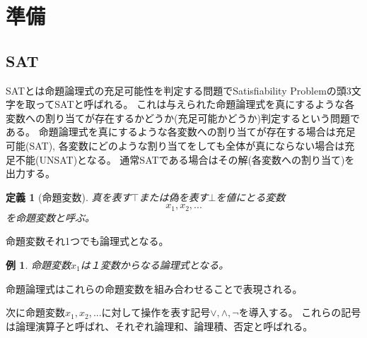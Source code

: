 \documentclass[titlepage]{jsarticle}
\newtheorem{definition}[thm]{定義}
\newtheorem{example}[thm]{例}
\begin{document}
\section{準備}





\subsection{SAT}



SATとは命題論理式の充足可能性を判定する問題でSatisfiability Problemの頭3文字を取ってSATと呼ばれる。
これは与えられた命題論理式を真にするような各変数への割り当てが存在するかどうか(充足可能かどうか)判定するという問題である。
命題論理式を真にするような各変数への割り当てが存在する場合は充足可能(SAT), 各変数にどのような割り当てをしても全体が真にならない場合は充足不能(UNSAT)となる。
通常SATである場合はその解(各変数への割り当て)を出力する。

\begin{definition}[命題変数]
	真を表す$\top$または偽を表す$\bot$を値にとる変数
	\[
	x_1, x_2, ...
	\]
	を命題変数と呼ぶ。
\end{definition}
命題変数それ1つでも論理式となる。
\begin{example}
	命題変数$x_1$は１変数からなる論理式となる。
\end{example}
命題論理式はこれらの命題変数を組み合わせることで表現される。

次に命題変数$x_1, x_2, ...$に対して操作を表す記号$\lor, \land, \neg$を導入する。
これらの記号は論理演算子と呼ばれ、それぞれ論理和、論理積、否定と呼ばれる。
\begin{comment}
命題変数$x_i$と$x_j$の論理和を$x_i \lor x_j$で表す。$x_i$と$x_j$がどちらも偽である場合に偽になり、それ以外の場合は真となる。
また、命題変数$x_i$と$x_j$の論理積$x_i \land x_j$で表す。$x_i$と$x_j$がどちらも真である場合に真になり、それ以外の場合は偽となる。
\[
	x_i \lor x_j = 
	\begin{cases}
		\bot & (x_i=x_j=\bot{の場合}) \\
		\top & ({それ以外の場合}) \\
	\end{cases}
	, 
	x_i \land x_j = 
	\begin{cases}
		\top & (x_i=x_j=\top{の場合}) \\
		\bot & ({それ以外の場合}) \\
	\end{cases}
\]

命題変数$x$に対してその否定を$\neg x_i$で表す。$x_i$が真である場合に$\neg x_i$は偽になり、$x_i$が偽である場合に$\neg x_i$は真となる。
\[
	\neg x_i =
	\begin{cases}
		\bot & (x_i=\top{の場合}) \\
		\top & (x_i=\bot{の場合}) \\
	\end{cases}
\]
\end{comment}
\end{document}
